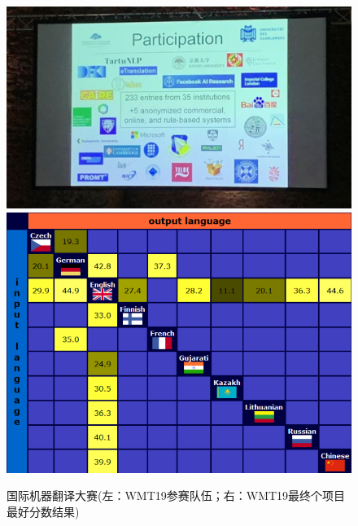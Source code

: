 \begin{figure}[htp]
    \centering
\includegraphics[scale=0.3]{./Chapter1/Figures/figure-wmt-participation.jpg}
\includegraphics[scale=0.3]{./Chapter1/Figures/figure-wmt-bestresults.jpg}
\setlength{\belowcaptionskip}{-1.5em}
    \caption{国际机器翻译大赛(左：WMT19参赛队伍；右：WMT19最终个项目最好分数结果)}
    \label{fig:1-6}
\end{figure}


\sectionnewpage
